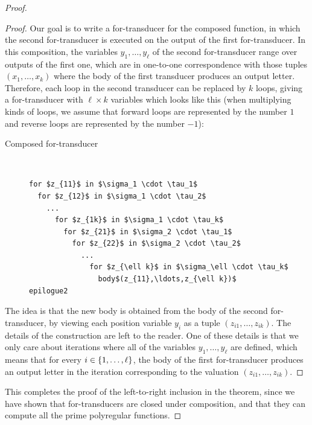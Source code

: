 \begin{proof}
\begin{proof}
Our goal is to write a for-transducer for the composed function, in which the second for-transducer is executed on the output of the first for-transducer. In this composition, the variables $y_1,\ldots,y_\ell$ of the second for-transducer range  over outputs of the first one, which are in one-to-one correspondence with those tuples $(x_1,\ldots,x_k)$ where the body of the first transducer produces an output letter. Therefore, each loop in the second transducer can be replaced by $k$ loops, giving a for-transducer with $\ell \times k$ variables 
which looks like this (when multiplying kinds of loops, we assume that forward loops are represented by the number $1$ and reverse loops are represented by the number $-1$):
\begin{description}
  \item[Composed for-transducer] \ 
                \begin{lstlisting}
for $z_{11}$ in $\sigma_1 \cdot \tau_1$
  for $z_{12}$ in $\sigma_1 \cdot \tau_2$
    ...
      for $z_{1k}$ in $\sigma_1 \cdot \tau_k$
        for $z_{21}$ in $\sigma_2 \cdot \tau_1$
          for $z_{22}$ in $\sigma_2 \cdot \tau_2$
            ...
              for $z_{\ell k}$ in $\sigma_\ell \cdot \tau_k$
                body$(z_{11},\ldots,z_{\ell k})$
epilogue2
            \end{lstlisting}
          \end{description}
  The idea is that the new body is obtained from the body of the second for-transducer, by viewing each position variable $y_i$ as a tuple $(z_{i1},\ldots,z_{ik})$. 
   The details of the construction are left to the reader. One of these details is that we only care about iterations where all of the variables $y_1,\ldots,y_\ell$ are defined, which means that for every $i \in \{1,\ldots,\ell\}$, the body of the first for-transducer produces an output letter in the iteration corresponding to the valuation $(z_{i1},\ldots,z_{ik})$. 
\end{proof}
This completes the proof of the left-to-right inclusion in the theorem, since we have shown that for-transducers are closed under composition, and that they can compute all the prime polyregular functions.


\end{proof}

